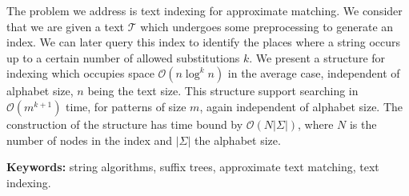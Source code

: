 The problem we address is text indexing for approximate matching. We consider that we are given a text $\mathcal{T}$ which undergoes some preprocessing to generate an index. We can later query this index to identify the places where a string occurs up to a certain number of allowed substitutions $k$. We present a structure for indexing which occupies space $\mathcal{O}(n\log^kn)$ in the average case, independent of alphabet size, $n$ being the text size. This structure support searching in $\mathcal{O}(m^{k+1})$ time, for patterns of size $m$, again independent of alphabet size. The construction of the structure has time bound by $\mathcal{O}(N|\Sigma|)$, where $N$ is the number of nodes in the index and $|\Sigma|$ the alphabet size.

\textbf{Keywords:} string algorithms, suffix trees, approximate text matching, text indexing.
